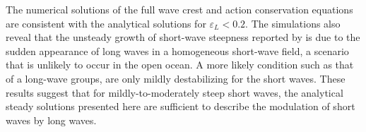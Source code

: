 \documentclass[lineno]{jfm}
\begin{document}
The numerical solutions of the full wave crest and action conservation equations
are consistent with the analytical solutions for $\varepsilon_L < 0.2$.
The simulations also reveal that the unsteady growth of short-wave steepness
reported by \citet{peureux2021unsteady} is due to the sudden appearance of
long waves in a homogeneous short-wave field, a scenario that is unlikely to
occur in the open ocean.
A more likely condition such as that of a long-wave groups, are only mildly
destabilizing for the short waves.
These results suggest that for mildly-to-moderately steep short waves,
the analytical steady solutions presented here are sufficient to describe the
modulation of short waves by long waves.









\end{document}
